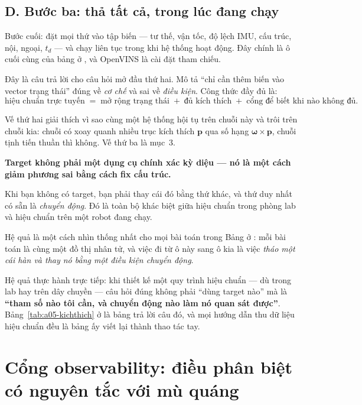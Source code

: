 \documentclass[../../vslam.tex]{subfiles}
\begin{document}
\subsection{D. Bước ba: thả tất cả, trong lúc đang chạy}

Bước cuối: đặt mọi thứ vào tập biến --- tư thế, vận tốc, độ lệch IMU, cấu trúc, nội, ngoại, \(t_d\) --- và chạy liên tục trong khi hệ thống hoạt động. Đây chính là ô cuối cùng của bảng ở , và OpenVINS \cite{geneva2020openvins} là cài đặt tham chiếu.

Đây là câu trả lời cho câu hỏi mở đầu thứ hai. Mô tả ``chỉ cần thêm biến vào vector trạng thái'' đúng về \emph{cơ chế} và sai về \emph{điều kiện}. Công thức đầy đủ là:
\[
\text{hiệu chuẩn trực tuyến} \;=\; \text{mở rộng trạng thái} \;+\; \text{đủ kích thích} \;+\; \text{cổng để biết khi nào không đủ}.
\]

Vế thứ hai giải thích vì sao cùng một hệ thống hội tụ trên chuỗi này và trôi trên chuỗi kia: chuỗi có xoay quanh nhiều trục kích thích \(\mathbf{p}\) qua số hạng \(\boldsymbol{\omega}\times\mathbf{p}\), chuỗi tịnh tiến thuần thì không. Vế thứ ba là mục~3.

\begin{cannho}
\textbf{Target không phải một dụng cụ chính xác kỳ diệu --- nó là một cách giảm phương sai bằng cách fix cấu trúc.}

Khi bạn không có target, bạn phải thay cái đó bằng thứ khác, và thứ duy nhất có sẵn là \emph{chuyển động}. Đó là toàn bộ khác biệt giữa hiệu chuẩn trong phòng lab và hiệu chuẩn trên một robot đang chạy.

Hệ quả là một cách nhìn thống nhất cho mọi bài toán trong Bảng ở : mỗi bài toán là cùng một đồ thị nhân tử, và việc đi từ ô này sang ô kia là việc \emph{tháo một cái hàn và thay nó bằng một điều kiện chuyển động}.

Hệ quả thực hành trực tiếp: khi thiết kế một quy trình hiệu chuẩn --- dù trong lab hay trên dây chuyền --- câu hỏi đúng không phải ``dùng target nào'' mà là \textbf{``tham số nào tôi cần, và chuyển động nào làm nó quan sát được''}. Bảng~\ref{tab:a05-kichthich} ở  là bảng trả lời câu đó, và mọi hướng dẫn thu dữ liệu hiệu chuẩn đều là bảng ấy viết lại thành thao tác tay.
\end{cannho}

\section{Cổng observability: điều phân biệt có nguyên tắc với mù quáng}
\end{document}
